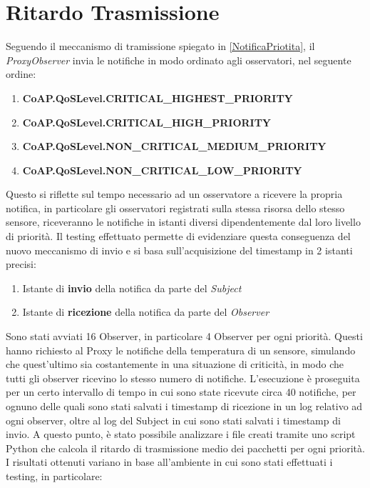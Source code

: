   \section{Ritardo Trasmissione}
    Seguendo il meccanismo di tramissione spiegato in \ref{NotificaPriotita}, il \textit{ProxyObserver} invia le notifiche in modo ordinato agli osservatori, nel seguente ordine:
    \begin{enumerate}
      \item \textbf{CoAP.QoSLevel.CRITICAL\_HIGHEST\_PRIORITY}
      \item \textbf{CoAP.QoSLevel.CRITICAL\_HIGH\_PRIORITY}
      \item \textbf{CoAP.QoSLevel.NON\_CRITICAL\_MEDIUM\_PRIORITY}
      \item \textbf{CoAP.QoSLevel.NON\_CRITICAL\_LOW\_PRIORITY}
    \end{enumerate}
    Questo si riflette sul tempo necessario ad un osservatore a ricevere la propria notifica, in particolare gli osservatori registrati sulla stessa risorsa dello stesso sensore, riceveranno le notifiche in istanti diversi dipendentemente dal loro livello di priorità.
    Il testing effettuato permette di evidenziare questa conseguenza del nuovo meccanismo di invio e si basa sull'acquisizione del timestamp in 2 istanti precisi:
    \begin{enumerate}
      \item Istante di \textbf{invio} della notifica da parte del \textit{Subject}
      \item Istante di \textbf{ricezione} della notifica da parte del \textit{Observer}
    \end{enumerate}
    Sono stati avviati 16 Observer, in particolare 4 Observer per ogni priorità. Questi hanno richiesto al Proxy le notifiche della temperatura di un sensore, simulando che quest'ultimo sia costantemente in una situazione di criticità, in modo che tutti gli observer ricevino lo stesso numero di notifiche. \newline
    L'esecuzione è proseguita per un certo intervallo di tempo in cui sono state ricevute circa 40 notifiche, per ognuno delle quali sono stati salvati i timestamp di ricezione in un log relativo ad ogni observer, oltre al log del Subject in cui sono stati salvati i timestamp di invio. A questo punto, è stato possibile analizzare i file creati tramite uno script Python che calcola il ritardo di trasmissione medio dei pacchetti per ogni priorità. \newline
    I risultati ottenuti variano in base all'ambiente in cui sono stati effettuati i testing, in particolare:
